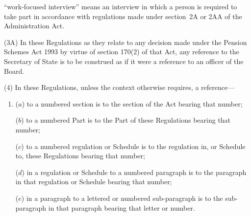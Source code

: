 \documentclass[12pt,a4paper]{article}
\begin{document}
\begin{enumerate}


“work-focused interview” means an interview in which a person is required to take part in accordance with regulations made under section~2A or 2AA of the Administration Act.

\end{enumerate}

(3A) In these Regulations as they relate to any decision made under the Pension Schemes Act 1993 by virtue of section 170(2) of that Act, any reference to the Secretary of State is to be construed as if it were a reference to an officer of the Board.

(4) In these Regulations, unless the context otherwise requires, a reference—
\begin{enumerate}\item[]
($a$) to a numbered section is to the section of the Act bearing that number;

($b$) to a numbered Part is to the Part of these Regulations bearing that number;

($c$) to a numbered regulation or Schedule is to the regulation in, or Schedule to, these Regulations bearing that number;

($d$) in a regulation or Schedule to a numbered paragraph is to the paragraph in that regulation or Schedule bearing that number;

($e$) in a paragraph to a lettered or numbered sub-paragraph is to the sub-paragraph in that paragraph bearing that letter or number.
\end{enumerate}
\end{document}
